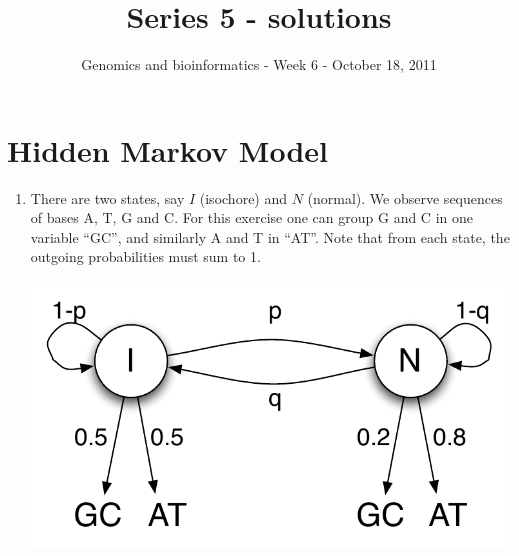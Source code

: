 \documentclass[a4paper,11pt]{article}
\title{Series 5 - solutions}
\date{}
\author{Genomics and bioinformatics - Week 6 - October 18, 2011}
\begin{document}
\maketitle

\section{Hidden Markov Model}
\begin{enumerate}
\item There are two states, say $I$ (isochore) and $N$ (normal). We observe sequences of bases A, T, G and C. For this exercise one can group G and C in one variable ``GC'', and similarly A and T in ``AT''. Note that from each state, the outgoing probabilities must sum to 1.

\begin{center}
\includegraphics[height=0.2\textwidth]{hmm.pdf}
\end{center}


\end{enumerate}
\end{document}
